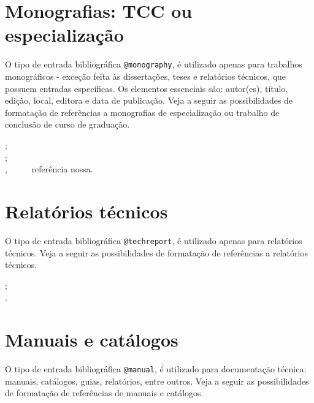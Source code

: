 \begin{apendicesenv}
\section{Monografias: TCC ou especialização}
\label{sec:monography}

O tipo de entrada bibliográfica \verb|@monography|, é utilizado apenas para trabalhos monográficos - exceção feita às dissertações, teses e relatórios técnicos, que possuem entradas específicas. Os elementos essenciais são: autor(es), título, edição, local, editora e data de publicação. Veja a seguir as possibilidades de formatação de referências a monografias de especialização ou trabalho de conclusão de curso de graduação.

{\small
    \cite{morgado1990} ;\\
    \cite{morgado1990b} ;\\
    \cite{Silva2013} ,   \ \ \ \ \ referência nossa.\\
}



\section{Relatórios técnicos}
\label{sec:techreport}


O tipo de entrada bibliográfica \verb|@techreport|, é utilizado apenas para relatórios técnicos. Veja a seguir as possibilidades de formatação de referências a relatórios técnicos.

{\small
    \cite{biblioteca1983} ;\\
    \cite{biblioteca1985}.\\
}



\section{Manuais e catálogos}
\label{sec:manual}


O tipo de entrada bibliográfica \verb|@manual|, é utilizado para documentação técnica: manuais, catálogos, guias, relatórios, entre outros. Veja a seguir as possibilidades de formatação de referências de manuais e catálogos.


\end{apendicesenv}
